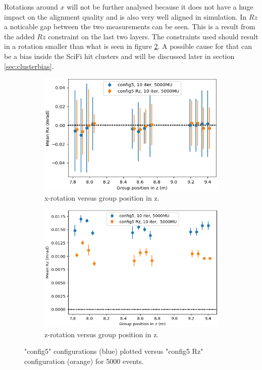 Rotations around $x$ will not be further analysed because it does not have a huge impact on the alignment quality and is also very well aligned in simulation. In $Rz$ a noticable gap
between the two measurements can be seen. This is a result from the added $Rz$ constraint on the last two layers.
The constraints used should result in a rotation smaller than what is seen in figure \ref{fig:config5_Rz}.
A possible cause for that can be a bias inside the SciFi hit clusters and will be discussed later in section \ref{sec:clusterbias}.

\begin{figure}
  \centering
  \begin{subfigure}[b]{0.48\textwidth}
    \centering
    \includegraphics[width=\textwidth]{plots/renewed_plots/Rx_config5.png}
    \caption{x-rotation versus group position in z.}
    \label{fig:config5_Rx}
  \end{subfigure}
  \hfill
  \begin{subfigure}[b]{0.48\textwidth}
    \centering
    \includegraphics[width=\textwidth]{plots/renewed_plots/Rz_config5.png}
    \caption{z-rotation versus group position in z.}
    \label{fig:config5_Rz}
  \end{subfigure}
  \caption{"config5" configurations (blue) plotted versus "config5 Rz" configuration (orange) for 5000 events.}
  \label{fig:config5_rot}
\end{figure}

